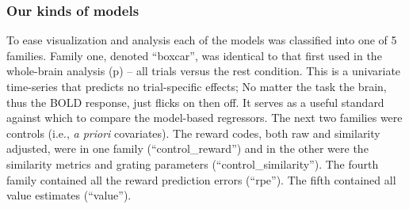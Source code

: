 \documentclass[doc,12pt]{apa}        %
\begin{document}
\subsubsection{Our kinds of models}
\label{subsub:ourkinds}
To ease visualization and analysis each of the models was classified into one of 5 families.  Family one, denoted ``boxcar'', was identical to that first used in the whole-brain analysis (p\pageref{sub:blob}) -- all trials versus the rest condition.  This is a univariate time-series that predicts no trial-specific effects; No matter the task the brain, thus the BOLD response, just flicks on then off.  It serves as a useful standard against which to compare the model-based regressors.  The next two families were controls (i.e., \emph{a priori} covariates). The reward codes, both raw and similarity adjusted, were in one family (``control\_reward'') and in the other were the similarity metrics and grating parameters (``control\_similarity'').  The fourth family contained all the reward prediction errors (``rpe'').  The fifth contained all value estimates (``value'').
\end{document}
